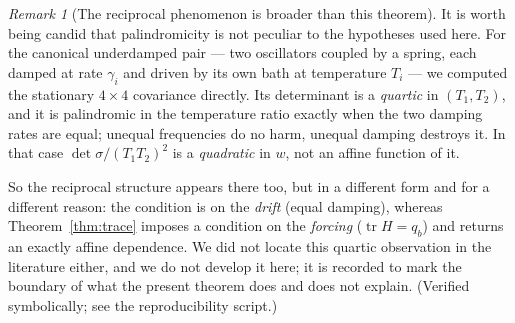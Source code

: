 \documentclass[11pt]{article}
\theoremstyle{plain}
\theoremstyle{definition}
\theoremstyle{remark}
\newtheorem{remark}[theorem]{Remark}
\newcommand{\tr}{\operatorname{tr}}
\begin{document}
\begin{remark}[The reciprocal phenomenon is broader than this theorem]\label{rem:quantum}
It is worth being candid that palindromicity is not peculiar to the hypotheses used here. For the
canonical underdamped pair --- two oscillators coupled by a spring, each damped at rate
$\gamma_i$ and driven by its own bath at temperature $T_i$ --- we computed the stationary
$4\times4$ covariance directly. Its determinant is a \emph{quartic} in $(T_1,T_2)$, and it is
palindromic in the temperature ratio exactly when the two damping rates are equal; unequal
frequencies do no harm, unequal damping destroys it. In that case
$\det\sigma/(T_1T_2)^2$ is a \emph{quadratic} in $w$, not an affine function of it.

So the reciprocal structure appears there too, but in a different form and for a different
reason: the condition is on the \emph{drift} (equal damping), whereas
Theorem~\ref{thm:trace} imposes a condition on the \emph{forcing} ($\tr H=q_b$) and returns an
exactly affine dependence. We did not locate this quartic observation in the literature either,
and we do not develop it here; it is recorded to mark the boundary of what the present theorem
does and does not explain. (Verified symbolically; see the reproducibility script.)
\end{remark}
\end{document}
